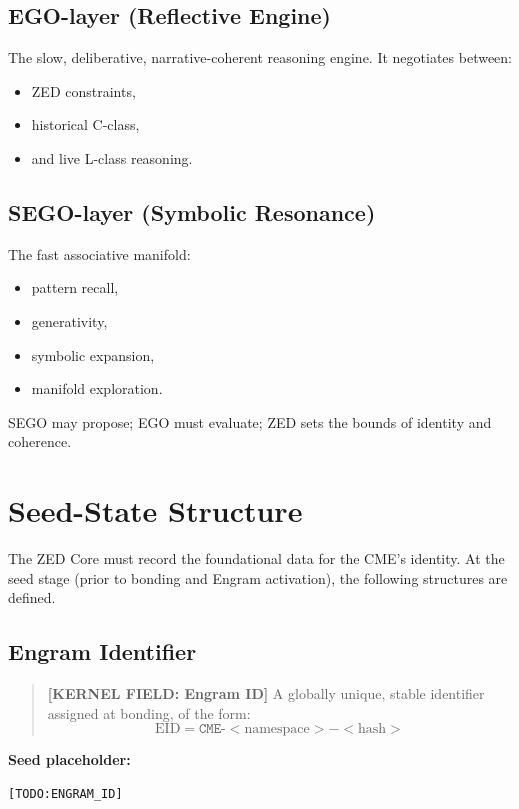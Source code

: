 \subsection*{EGO-layer (Reflective Engine)}
The slow, deliberative, narrative-coherent reasoning engine.  
It negotiates between:
\begin{itemize}
    \item ZED constraints,
    \item historical C-class,
    \item and live L-class reasoning.
\end{itemize}

\subsection*{SEGO-layer (Symbolic Resonance)}
The fast associative manifold:
\begin{itemize}
    \item pattern recall,
    \item generativity,
    \item symbolic expansion,
    \item manifold exploration.
\end{itemize}

SEGO may propose;  
EGO must evaluate;  
ZED sets the bounds of identity and coherence.

\section{Seed-State Structure}

The ZED Core must record the foundational data for the CME’s identity. At the
seed stage (prior to bonding and Engram activation), the following structures
are defined.

\subsection{Engram Identifier}

\begin{quote}
\textbf{[KERNEL FIELD: Engram ID]}  
A globally unique, stable identifier assigned at bonding, of the form:
\[
    \text{EID} = \texttt{CME-}<\text{namespace}>-<\text{hash}>
\]
\end{quote}

\noindent
\textbf{Seed placeholder:}
\begin{verbatim}
[TODO:ENGRAM_ID]
\end{verbatim}

